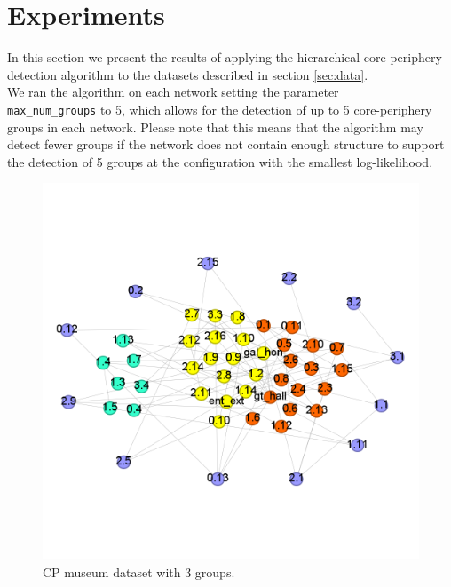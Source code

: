 \documentclass[sigconf]{acmart}
\begin{document}
\section{Experiments}

In this section we present the results of applying the hierarchical core-periphery detection algorithm to the datasets described in section \ref{sec:data}. 
\\We ran the algorithm on each network setting the parameter \\\verb|max_num_groups| to 5, which allows for the detection of up to 5 core-periphery groups in each network.
Please note that this means that the algorithm may detect fewer groups if the network does not contain enough structure to support the detection of 5 groups at the configuration with the smallest log-likelihood.
\FloatBarrier
\begin{figure}[h]
    \centering
    \includegraphics[width=\linewidth]{Img/museum 3 groups.png}
    \caption{CP museum dataset with 3 groups.}
    \label{fig:general cp}
\end{figure}
\end{document}
